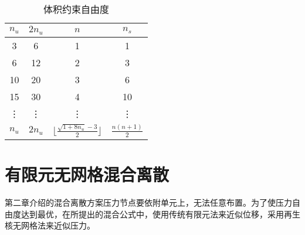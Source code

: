 \begin{table}[ht!]
    \centering
    \caption{体积约束自由度}\label{tab:constraint}
    \setlength{\tabcolsep}{10mm}
    \renewcommand{\arraystretch}{2}
    \begin{tabular}{cccc}
        \toprule
            $n_u$ & $2n_u$ & $n$ &$ n_s$\\
        \midrule
        3  & 6  & 1 & 1 \\
        6  & 12 & 2 & 3 \\
        10 & 20 & 3 & 6 \\
        15 & 30 & 4 & 10 \\
        \vdots & \vdots & \vdots & \vdots \\
        $n_u$ & $2n_u$ & $\lfloor\frac{\sqrt{1+8n_u}-3}{2}\rfloor$ & $\frac{n(n+1)}{2}$  \\
        \bottomrule
    \end{tabular}
\end{table}
\section{有限元无网格混合离散}
第二章介绍的混合离散方案压力节点要依附单元上，无法任意布置。为了使压力自由度达到最优，在所提出的混合公式中，使用传统有限元法来近似位移，采用再生核无网格法来近似压力。
